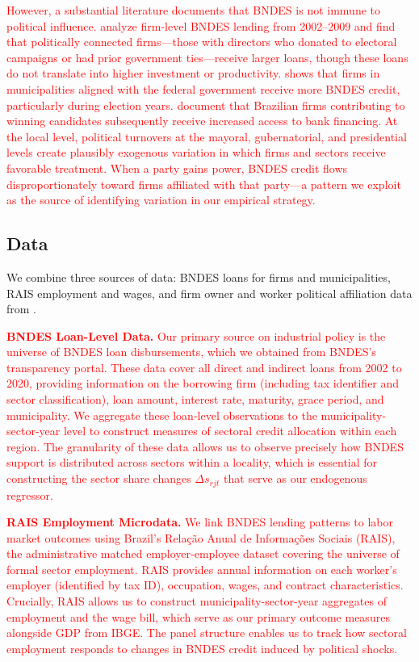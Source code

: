 \documentclass{article}
\begin{document}
\textcolor{red}{However, a substantial literature documents that BNDES is not immune to political influence. \citet{lazzarini2015state} analyze firm-level BNDES lending from 2002--2009 and find that politically connected firms---those with directors who donated to electoral campaigns or had prior government ties---receive larger loans, though these loans do not translate into higher investment or productivity. \citet{carvalho2014real} shows that firms in municipalities aligned with the federal government receive more BNDES credit, particularly during election years. \citet{claessens2008political} document that Brazilian firms contributing to winning candidates subsequently receive increased access to bank financing. At the local level, political turnovers at the mayoral, gubernatorial, and presidential levels create plausibly exogenous variation in which firms and sectors receive favorable treatment. When a party gains power, BNDES credit flows disproportionately toward firms affiliated with that party---a pattern we exploit as the source of identifying variation in our empirical strategy.}



\subsection{Data}\label{sec:data}

We combine three sources of data: BNDES loans for firms and municipalities, RAIS employment and wages, and firm owner and worker political affiliation data from \citet{colonnelli2025politics}.

\textcolor{red}{\textbf{BNDES Loan-Level Data.} Our primary source on industrial policy is the universe of BNDES loan disbursements, which we obtained from BNDES's transparency portal. These data cover all direct and indirect loans from 2002 to 2020, providing information on the borrowing firm (including tax identifier and sector classification), loan amount, interest rate, maturity, grace period, and municipality. We aggregate these loan-level observations to the municipality-sector-year level to construct measures of sectoral credit allocation within each region. The granularity of these data allows us to observe precisely how BNDES support is distributed across sectors within a locality, which is essential for constructing the sector share changes $\Delta s_{rjt}$ that serve as our endogenous regressor.}

\textcolor{red}{\textbf{RAIS Employment Microdata.} We link BNDES lending patterns to labor market outcomes using Brazil's Rela\c{c}\~ao Anual de Informa\c{c}\~oes Sociais (RAIS), the administrative matched employer-employee dataset covering the universe of formal sector employment. RAIS provides annual information on each worker's employer (identified by tax ID), occupation, wages, and contract characteristics. Crucially, RAIS allows us to construct municipality-sector-year aggregates of employment and the wage bill, which serve as our primary outcome measures alongside GDP from IBGE. The panel structure enables us to track how sectoral employment responds to changes in BNDES credit induced by political shocks.}
\end{document}
